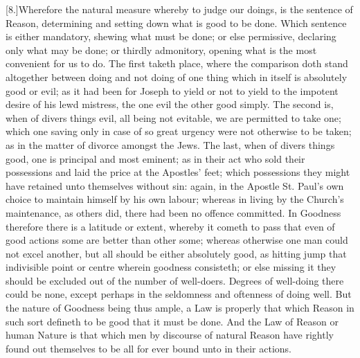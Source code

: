 [8.]Wherefore the natural measure whereby to judge our doings, is the sentence of Reason, determining and setting down what is good to be done. Which sentence is either mandatory, shewing what must be done; or else permissive, declaring only what may be done; or thirdly admonitory, opening what is the most convenient for us to do. The first taketh place, where the comparison doth stand altogether between doing and not doing of one thing which in itself is absolutely good or evil; as it had been for Joseph to yield or not to yield to the impotent desire of his lewd mistress, the one evil the other good simply. The second is, when of divers things evil, all being not evitable, we are permitted to take one; which one saving only in case of so great urgency were not otherwise to be taken; as in the matter of divorce amongst the Jews. The last, when of divers things good, one is principal and most eminent; as in their act who sold their possessions and laid the price at the Apostles’ feet; which possessions they might have retained unto themselves without sin: again, in the Apostle St. Paul’s own choice to maintain himself by his own labour; whereas in living by the Church’s maintenance, as others did, there had been no offence committed. In Goodness therefore there is a latitude or extent, whereby it cometh to pass that even of good actions some are better than other some; whereas  otherwise one man could not excel another, but all should be either absolutely good, as hitting jump that indivisible point or centre wherein goodness consisteth; or else missing it they should be excluded out of the number of well-doers. Degrees of well-doing there could be none, except perhaps in the seldomness and oftenness of doing well. But the nature of Goodness being thus ample, a Law is properly that which Reason in such sort defineth to be good that it must be done. And the Law of Reason or human Nature is that which men by discourse of natural Reason have rightly found out themselves to be all for ever bound unto in their actions.

